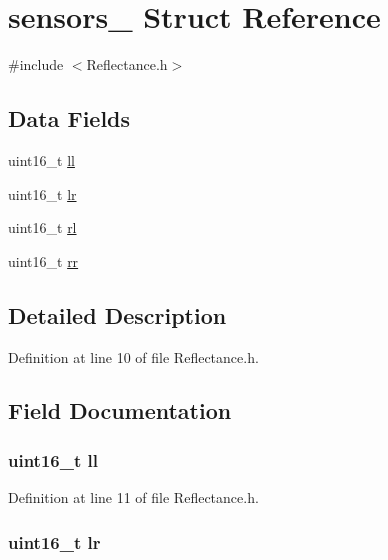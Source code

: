 \hypertarget{structsensors__}{}\section{sensors\+\_\+ Struct Reference}
\label{structsensors__}


{\ttfamily \#include $<$Reflectance.\+h$>$}

\subsection*{Data Fields}
\begin{DoxyCompactItemize}
\item 
uint16\+\_\+t \hyperlink{structsensors___ae59d16ddcc59d6f6633ff99307ff7190}{ll}
\item 
uint16\+\_\+t \hyperlink{structsensors___af650f74b54fbe6d55c96161d2a7098ea}{lr}
\item 
uint16\+\_\+t \hyperlink{structsensors___a55f8b53aee5b41e8af88a816fab2b70b}{rl}
\item 
uint16\+\_\+t \hyperlink{structsensors___a6988d1a89f109b3f8d0e06547a5362f6}{rr}
\end{DoxyCompactItemize}


\subsection{Detailed Description}


Definition at line 10 of file Reflectance.\+h.



\subsection{Field Documentation}
\subsubsection[{\texorpdfstring{ll}{ll}}]{\setlength{\rightskip}{0pt plus 5cm}uint16\+\_\+t ll}\hypertarget{structsensors___ae59d16ddcc59d6f6633ff99307ff7190}{}\label{structsensors___ae59d16ddcc59d6f6633ff99307ff7190}


Definition at line 11 of file Reflectance.\+h.

\subsubsection[{\texorpdfstring{lr}{lr}}]{\setlength{\rightskip}{0pt plus 5cm}uint16\+\_\+t lr}\hypertarget{structsensors___af650f74b54fbe6d55c96161d2a7098ea}{}\label{structsensors___af650f74b54fbe6d55c96161d2a7098ea}


